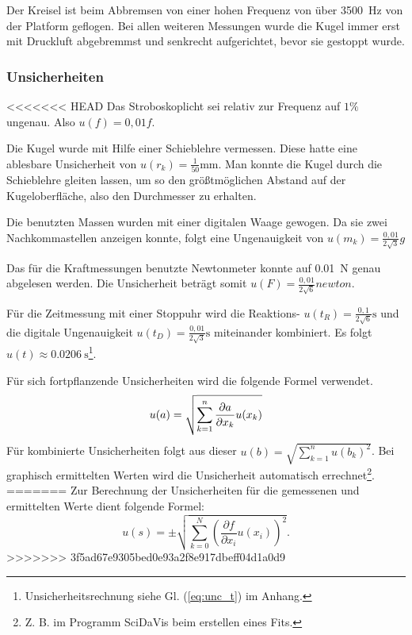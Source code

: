 	Der Kreisel ist beim Abbremsen von einer hohen Frequenz von über \SI{3500}{\hertz} von der Platform geflogen.
	Bei allen weiteren Messungen wurde die Kugel immer erst mit Druckluft abgebremmst und senkrecht aufgerichtet, bevor sie gestoppt wurde.
	
	\subsubsection{Unsicherheiten}
	
<<<<<<< HEAD
	Das Stroboskoplicht sei relativ zur Frequenz auf $1\%$ ungenau.
	Also $u(f) = 0,01 f$.
	
	Die Kugel wurde mit Hilfe einer Schieblehre vermessen.
	Diese hatte eine ablesbare Unsicherheit von $u(r_k) =\frac{1}{50}\si{\milli\meter}$.
	Man konnte die Kugel durch die Schieblehre gleiten lassen, um so den größtmöglichen Abstand auf der Kugeloberfläche, also den Durchmesser zu erhalten.
	
	Die benutzten Massen wurden mit einer digitalen Waage gewogen.
	Da sie zwei Nachkommastellen anzeigen konnte, folgt eine Ungenauigkeit von $u(m_k) = \frac{0,01}{2\sqrt{3}}\si{g}$
	
	Das für die Kraftmessungen benutzte Newtonmeter konnte auf \SI{0,01}{\newton} genau abgelesen werden.
	Die Unsicherheit beträgt somit $u(F) = \frac{0,01}{2\sqrt{6}} \si{newton}$.
	
	Für die Zeitmessung mit einer Stoppuhr wird die Reaktions- $u(t_R) = \frac{0,1}{2\sqrt6}\si{\second}$ und die digitale Ungenauigkeit $u(t_D) = \frac{0,01}{2\sqrt3}\si{\second}$ miteinander kombiniert.
	Es folgt $u(t) \approx \SI{0,0206}{\second}$\footnote{Unsicherheitsrechnung siehe Gl. (\ref{eq:unc_t}) im Anhang.}.
	
	Für sich fortpflanzende Unsicherheiten wird die folgende Formel verwendet.
	\begin{equation}
		\label{eq:unc_combined}
		u(a) = \sqrt{\sum_{k=1}^{n} \pdv{a}{x_k} u(x_k)}
	\end{equation}
	Für kombinierte Unsicherheiten folgt aus dieser $u(b) = \sqrt{\sum_{k=1}^n u(b_k)^2}$.
	Bei graphisch ermittelten Werten wird die Unsicherheit automatisch errechnet\footnote{Z. B. im Programm SciDaVis beim erstellen eines Fits.}.
=======
		Zur Berechnung der Unsicherheiten für die gemessenen und ermittelten Werte dient folgende Formel: 
		\begin{equation*}
		u(s) = \pm \sqrt{\sum_{k=0}^{N}\left( \frac{\partial f}{\partial x_i}u(x_i)\right) ^2}. 
		\end{equation*}
>>>>>>> 3f5ad67e9305bed0e93a2f8e917dbeff04d1a0d9

